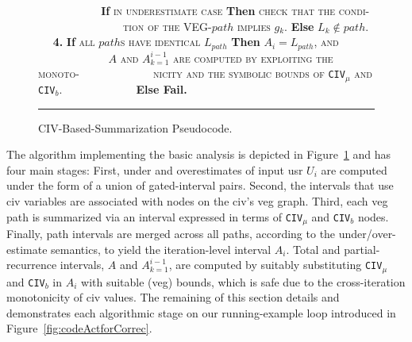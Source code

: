 \documentclass{sig-alternate}
\begin{document}
\begin{figure}[t]
\begin{small}
$\mbox{ }\mbox{ }\mbox{ }\mbox{ }\mbox{ }\mbox{ }\mbox{ }\mbox{ }$
            {\bf If} \textsc{in underestimate case} {\bf Then} \textsc{check that the condi-}
$\mbox{ }\mbox{ }\mbox{ }\mbox{ }\mbox{ }\mbox{ }\mbox{ }\mbox{ }\mbox{ }\mbox{ }\mbox{ }$
\textsc{tion of the VEG-$path$ implies $g_k$}. {\bf Else} $L_k \not\in path$.\vspace{2ex}\newline
$\mbox{ }\mbox{ }${\bf4.} {\bf If} \textsc{all $path$s have identical $L_{path}$} {\bf Then} $A_i = L_{path}$, \textsc{and}\newline 
$\mbox{ }\mbox{ }\mbox{ }\mbox{ }\mbox{ }\mbox{ }\mbox{ }\mbox{ }\mbox{ }$
            \textsc{$A$ and $A_{k=1}^{i-1}$ are computed by exploiting the monoto-}\newline 
$\mbox{ }\mbox{ }\mbox{ }\mbox{ }\mbox{ }\mbox{ }\mbox{ }\mbox{ }\mbox{ }$
\textsc{nicity and the symbolic bounds of {\tt CIV$_\mu$} {\sc and} {\tt CIV$_b$}.}\newline
$\mbox{ }\mbox{ }\mbox{ }\mbox{ }\mbox{ }\mbox{ }\mbox{ }\mbox{ }\mbox{ }$ {\bf Else Fail.}\vspace{1ex}
\end{small}
\hrule
\caption{ CIV-Based-Summarization Pseudocode.}
\label{fig:BasicTechnique} %
\end{figure}


The algorithm implementing the basic analysis is depicted in 
Figure~\ref{fig:BasicTechnique} and has four main stages: 
First, under and overestimates of input {\sc usr} $U_i$ are 
computed under the form of a union of gated-interval pairs.   %
Second, the intervals that use {\sc civ} variables are 
associated with nodes on the {\sc civ}'s {\sc veg} graph. %
Third, each {\sc veg} path is summarized via an interval expressed 
in terms of {\tt CIV$_\mu$} and {\tt CIV$_b$} nodes.\\
\noindent Finally, path intervals are merged across all paths, according to 
the under/over-estimate semantics, to yield the iteration-level interval $A_i$.
Total and partial-recurrence intervals, $A$ and $A_{k=1}^{i-1}$, 
are computed by suitably substituting {\tt CIV$_\mu$} and 
{\tt CIV$_b$} in $A_i$ with suitable ({\sc veg}) bounds,
which is safe due to the cross-iteration monotonicity of {\sc civ} values.
The remaining of this section details and demonstrates each algorithmic stage
on our running-example loop introduced in Figure~\ref{fig:codeActforCorrec}.
\end{document}
